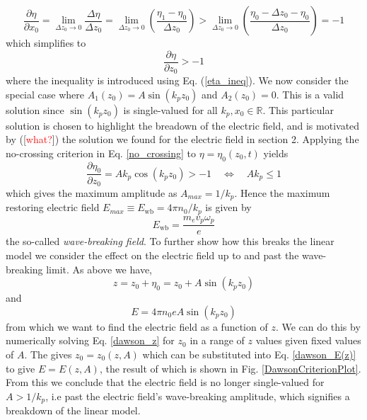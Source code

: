\begin{equation}
\frac{\partial \eta}{\partial x_0}=\lim_{\Delta z_0\to 0}\frac{\Delta \eta}{\Delta z_0}=\lim_{\Delta z_0\to 0}\left(\frac{\eta_1-\eta_0}{\Delta z_0}\right)>\lim_{\Delta z_0\to 0}\left(\frac{\eta_0-\Delta z_0-\eta_0}{\Delta z_0}\right)=-1
\end{equation}
which simplifies to
\begin{equation}
\frac{\partial \eta}{\partial z_0}>-1
\label{no_crossing}
\end{equation}
where the inequality is introduced using Eq. (\ref{eta_ineq}). We now consider the special case where $A_1(z_0)=A\sin(k_pz_0)$ and $A_2(z_0)=0$. This is a valid solution since $\sin(k_pz_0)$ is single-valued for all $k_p,x_0\in\mathbb{R}$. This particular solution is chosen to highlight the breadown of the electric field, and is motivated by ([\textcolor{red}{what?}]) the solution we found for the electric field in section 2. Applying the no-crossing criterion in Eq. \ref{no_crossing} to $\eta=\eta_0(z_0,t)$ yields
\begin{equation}
\frac{\partial \eta_0}{\partial z_0}=Ak_p\cos(k_pz_0)>-1 \quad \Leftrightarrow \quad Ak_p\leq 1
\end{equation}
which gives the maximum amplitude as $A_{max}=1/k_p$. Hence the maximum restoring electric field $E_{max}\equiv E_{\text{wb}}=4\pi n_0/k_p$ is given by
\begin{equation}
E_{\text{wb}}=\frac{m_ev_p\omega_p}{e}
\end{equation}
the so-called \textit{wave-breaking field}. To further show how this breaks the linear model we consider the effect on the electric field up to and past the wave-breaking limit. As above we have, 
\begin{equation}
z=z_0+\eta_0=z_0+A\sin(k_p z_0)
\label{dawson_z}
\end{equation}
and 
\begin{equation}
E=4\pi n_0e A\sin(k_p z_0)
\label{dawson_E(z)}
\end{equation}
from which we want to find the electric field as a function of $z$. We can do this by numerically solving Eq. \ref{dawson_z} for $z_0$ in a range of $z$ values given fixed values of $A$. The gives $z_0=z_0(z,A)$ which can be substituted into Eq. \ref{dawson_E(z)} to give $E=E(z,A)$, the result of which is shown in Fig. \ref{DawsonCriterionPlot}. From this we conclude that the electric field is no longer single-valued for $A>1/k_p$, i.e past the electric field's wave-breaking amplitude, which signifies a breakdown of the linear model.\\
